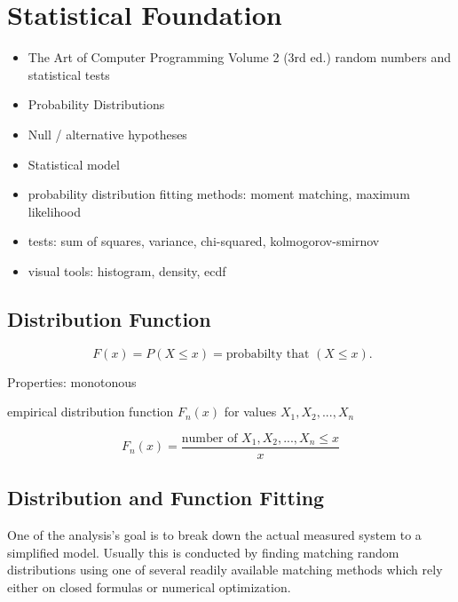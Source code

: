 \section{Statistical Foundation}

\begin{itemize}
\item The Art of Computer Programming Volume 2 (3rd ed.) random numbers and statistical tests\cite{Knuth:1997:ACP:270146}
\item Probability Distributions
\item Null / alternative hypotheses
\item Statistical model
\item probability distribution fitting
		methods: moment matching, maximum likelihood
\item tests: sum of squares, variance, chi-squared, kolmogorov-smirnov
\item visual tools: histogram, density, ecdf

\end{itemize}

\subsection{Distribution Function}

\begin{equation}
\phantom{.} F(x) = P(X\leq x) = \text{probabilty that } (X \leq x).
\end{equation}

Properties: monotonous

empirical distribution function $F_n(x)$ for values $X_1, X_2, ... , X_n$

\begin{equation}
F_n(x) = \frac{\text{number of }X_1, X_2, ... , X_n \leq x}{x}
\end{equation}


\subsection{Distribution and Function Fitting}

One of the analysis's goal is to break down the actual measured system to a simplified model. Usually this is conducted by finding matching random distributions using one of several readily available matching methods which rely either on closed formulas or numerical optimization.

